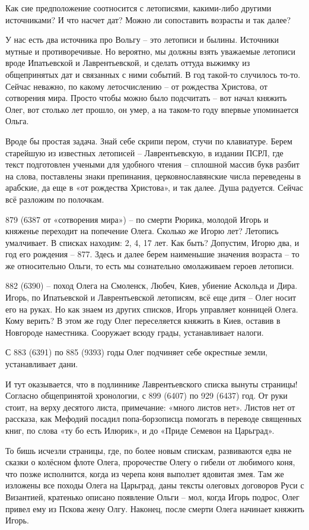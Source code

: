 Как сие предположение соотносится с летописями, какими-либо другими источниками? И что насчет дат? Можно ли сопоставить возрасты и так далее?

У нас есть два источника про Вольгу – это летописи и былины. Источники мутные и противоречивые. Но вероятно, мы должны взять уважаемые летописи вроде Ипатьевской и Лаврентьевской, и сделать оттуда выжимку из общепринятых дат и связанных с ними событий. В год такой-то случилось то-то. Сейчас неважно, по какому летосчислению – от рождества Христова, от сотворения мира. Просто чтобы можно было подсчитать – вот начал княжить Олег, вот столько лет прошло, он умер, а на таком-то году впервые упоминается Ольга.

Вроде бы простая задача. Знай себе скрипи пером, стучи по клавиатуре. Берем старейшую из известных летописей – Лаврентьевскую, в издании ПСРЛ, где текст подготовлен учеными для удобного чтения – сплошной массив букв разбит на слова, поставлены знаки препинания, церковнославянские числа переведены в арабские, да еще в «от рождества Христова», и так далее. Душа радуется. Сейчас всё разложим по полочкам.

879 (6387 от «сотворения мира») – по смерти Рюрика, молодой Игорь и княженье переходит на попечение Олега. Сколько же Игорю лет? Летопись умалчивает. В списках находим: 2, 4, 17 лет. Как быть? Допустим, Игорю два, и год его рождения – 877. Здесь и далее берем наименьшие значения возраста – то же относительно Ольги, то есть мы сознательно омолаживаем героев летописи.

882 (6390) – поход Олега на Смоленск, Любеч, Киев, убиение Аскольда и Дира. Игорь, по Ипатьевской и Лаврентьевской летописям, всё еще дитя – Олег носит его на руках. Но как знаем из других списков, Игорь управляет конницей Олега. Кому верить? В этом же году Олег переселяется княжить в Киев, оставив в Новгороде наместника. Сооружает всюду грады, устанавливает налоги.

С 883 (6391) по 885 (9393) годы Олег подчиняет себе окрестные земли, устанавливает дани.

И тут оказывается, что в подлиннике Лаврентьевского списка вынуты страницы! Согласно общепринятой хронологии, с 899 (6407) по 929 (6437) год. От руки стоит, на верху десятого листа, примечание: «много листов нет». Листов нет от рассказа, как Мефодий посадил попа-борзописца помогать в переводе священных книг, по слова «ту бо есть Илюрик», и до «Приде Семевон на Царьград». 

То бишь исчезли страницы, где, по более новым спискам, развиваются едва не сказки о колёсном флоте Олега, пророчестве Олегу о гибели от любимого коня, что позже исполнится, когда из черепа коня выползет ядовитая змея. Там же изложены все походы Олега на Царьград, даны тексты олеговых договоров Руси с Византией, кратенько описано появление Ольги – мол, когда Игорь подрос, Олег привел ему из Пскова жену Олгу. Наконец, после смерти Олега начинает княжить Игорь.

